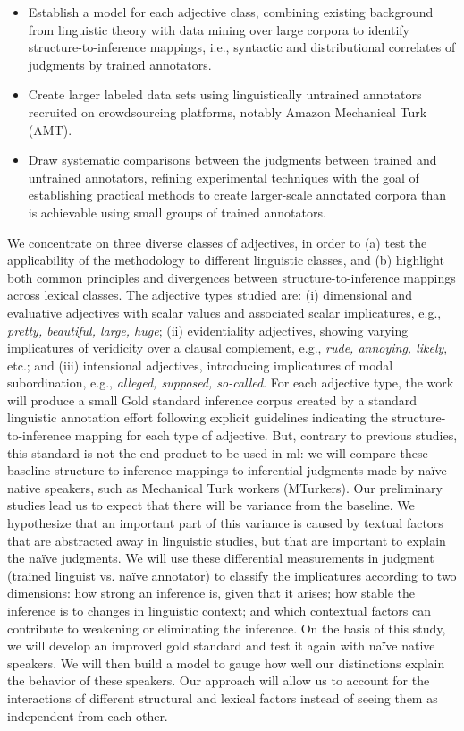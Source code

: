 \documentclass[10pt]{article}
\newcommand{\moveup}{\vspace*{-1.8mm}}
\begin{document}
\begin{itemize}

\moveup
\item Establish a model for each adjective class, combining existing background from linguistic theory with data mining over large corpora to identify structure-to-inference mappings, i.e., syntactic and distributional correlates of judgments by trained annotators.
\moveup
\item Create larger labeled data sets using linguistically untrained annotators recruited on crowdsourcing platforms, notably Amazon Mechanical Turk (AMT).
\moveup 
\item Draw systematic comparisons between the judgments between trained and untrained annotators, refining experimental techniques with the goal of establishing practical methods to create larger-scale annotated corpora than is achievable using small groups of trained annotators.
\end{itemize}
\moveup
 
We concentrate on three diverse classes of  adjectives, 
in order to (a) test the applicability of the methodology to different linguistic classes, and (b) highlight both common principles and divergences between structure-to-inference mappings across lexical classes. 
The adjective types studied are: 
(i) dimensional and evaluative adjectives with scalar values and associated scalar implicatures, e.g., \textit{pretty, beautiful, large, huge}; 
(ii) evidentiality adjectives, showing varying implicatures of veridicity over a clausal complement, e.g., \textit{rude, annoying, likely}, etc.; 
and (iii) intensional adjectives, introducing implicatures of modal subordination, e.g., \textit{alleged, supposed, so-called}. 
For each adjective type, the work will produce a small Gold standard inference corpus created by a standard linguistic annotation effort following explicit guidelines indicating the structure-to-inference mapping for each type of adjective. 
But, contrary to previous studies, this standard is not the end product to be used in {\sc ml}: we will compare these baseline structure-to-inference mappings to inferential judgments made by na\"ive native speakers, such as Mechanical Turk workers (MTurkers). 
Our preliminary studies lead us to expect that there will be variance from the baseline. 
We hypothesize that an important part of this variance is caused by textual factors that are abstracted away in linguistic studies, but that are important to explain the na\"ive judgments. 
We will use these differential measurements in judgment (trained linguist vs. na\"ive annotator) 
to classify the implicatures according to two dimensions: how strong an inference is, given that it arises; how stable the inference is to changes in linguistic context; and which contextual factors can contribute to weakening or eliminating the inference. 
On the basis of this study, we will develop an improved gold standard and test it again with na\"ive native speakers. 
We will then build a model to gauge how well our distinctions explain the behavior of these speakers. 
Our approach will allow us to account for the interactions of different structural and lexical factors instead of seeing them as independent from each other. 
\end{document}
